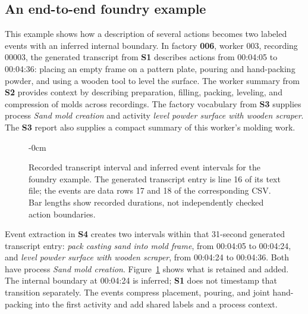 \subsection{An end-to-end foundry example}
\label{sec:worked}
This example shows how a description of several actions becomes two labeled events with an inferred internal boundary. In factory \textbf{006}, worker 003, recording 00003, the generated transcript from \textbf{S1} describes actions from 00:04:05 to 00:04:36: placing an empty frame on a pattern plate, pouring and hand-packing powder, and using a wooden tool to level the surface. The worker summary from \textbf{S2} provides context by describing preparation, filling, packing, leveling, and compression of molds across recordings. The factory vocabulary from \textbf{S3} supplies process \emph{Sand mold creation} and activity \emph{level powder surface with wooden scraper}. The \textbf{S3} report also supplies a compact summary of this worker's molding work.

\begin{figure}[!t]\begin{adjustwidth}{-\extralength}{0cm}\centering
{}
\caption{Recorded transcript interval and inferred event intervals for the foundry example. The generated transcript entry is line 16 of its text file; the events are data rows 17 and 18 of the corresponding CSV. Bar lengths show recorded durations, not independently checked action boundaries.}
\label{fig:worked}\end{adjustwidth}\end{figure}

Event extraction in \textbf{S4} creates two intervals within that 31-second generated transcript entry: \emph{pack casting sand into mold frame}, from 00:04:05 to 00:04:24, and \emph{level powder surface with wooden scraper}, from 00:04:24 to 00:04:36. Both have process \emph{Sand mold creation}. Figure~\ref{fig:worked} shows what is retained and added. The internal boundary at 00:04:24 is inferred; \textbf{S1} does not timestamp that transition separately. The events compress placement, pouring, and joint hand-packing into the first activity and add shared labels and a process context.

